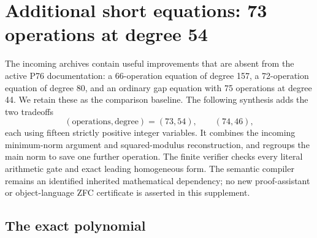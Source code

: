 \section{Additional short equations: 73 operations at degree 54}
\label{sec:short-synthesis}

The incoming archives contain useful improvements that are absent from
the active P76 documentation: a 66-operation equation of degree 157,
a 72-operation equation of degree 80, and an ordinary gap equation with
75 operations at degree 44. We retain these as the comparison baseline.
The following synthesis adds the two tradeoffs
\[
 (\text{operations},\text{degree})=(73,54),\qquad (74,46),
\]
each using fifteen strictly positive integer variables. It combines the
incoming minimum-norm argument and squared-modulus reconstruction, and
regroups the main norm to save one further operation. The finite verifier
checks every literal arithmetic gate and exact leading homogeneous form.
The semantic compiler remains an identified inherited mathematical
dependency; no new proof-assistant or object-language ZFC certificate is
asserted in this supplement.

\subsection{The exact polynomial}

